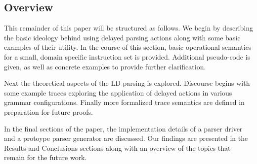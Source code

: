 \documentclass[a4paper,11pt]{article}
\begin{document}


\subsection{Overview}
This remainder of this paper will be structured as follows. 
We begin by describing the basic ideology behind using delayed parsing actions along with some basic examples of their utility.
In the course of this section, basic operational semantics for a small, domain specific instruction set is provided.
Additional pseudo-code is given, as well as concrete examples to provide further clarification.

Next the theoretical aspects of the LD parsing is explored.
Discourse begins with some example traces exploring the application of delayed actions in various grammar configurations. 
Finally more formalized trace semantics are defined in preparation for future proofs.

In the final sections of the paper, the implementation details of a parser driver and a protoype parser generator are discussed.
Our findings are presented in the Results and Conclusions sections along with an overview of the topics that remain for the future work.
\end{document}
